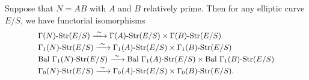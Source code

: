 \begin{plem}\label{lem:3.5.1}
Suppose that $N = AB$ with $A$ and $B$ relatively prime. Then for any elliptic curve $E/S$, we have functorial isomorphisms
\[
\small\begin{array}{@{}l@{}}
\displaystyle \Gamma(N)\text{-Str}(E/S) \xrightarrow{\ \sim\ } \Gamma(A)\text{-Str}(E/S) \times \Gamma(B)\text{-Str}(E/S) \\[2pt]
\displaystyle \Gamma_1(N)\text{-Str}(E/S) \xrightarrow{\ \sim\ } \Gamma_1(A)\text{-Str}(E/S) \times \Gamma_1(B)\text{-Str}(E/S) \\[2pt]
\displaystyle \mathrm{Bal}\ \Gamma_1(N)\text{-Str}(E/S) \xrightarrow{\ \sim\ } \mathrm{Bal}\ \Gamma_1(A)\text{-Str}(E/S) \times \mathrm{Bal}\ \Gamma_1(B)\text{-Str}(E/S) \\[2pt]
\displaystyle \Gamma_0(N)\text{-Str}(E/S) \xrightarrow{\ \sim\ } \Gamma_0(A)\text{-Str}(E/S) \times \Gamma_0(B)\text{-Str}(E/S).
\end{array}
\]
\end{plem}

